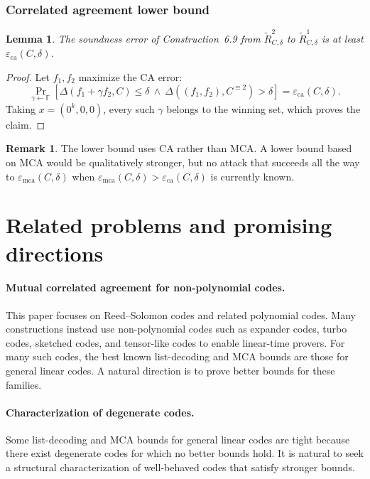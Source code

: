 \documentclass[11pt]{article}
\theoremstyle{plain}
\newtheorem{lemma}[theorem]{Lemma}
\theoremstyle{definition}
\newtheorem{remark}[theorem]{Remark}
\newcommand{\F}{\mathbb{F}}
\newcommand{\epsca}{\varepsilon_{\mathrm{ca}}}
\newcommand{\epsmca}{\varepsilon_{\mathrm{mca}}}
\DeclareMathOperator*{\Prb}{Pr}
\begin{document}
\subsubsection{Correlated agreement lower bound}

\begin{lemma}
The soundness error of Construction~6.9 from $\widetilde R_{C,\delta}^2$ to $\widetilde R_{C,\delta}^1$ is at least $\epsca(C,\delta)$.
\end{lemma}

\begin{proof}
Let $f_1,f_2$ maximize the CA error:
\[
\Prb_{\gamma\leftarrow\F}\left[
\Delta(f_1+\gamma f_2,C)\le\delta
\ \wedge\
\Delta((f_1,f_2),C^{\equiv2})>\delta
\right]=\epsca(C,\delta).
\]
Taking $x=(0^k,0,0)$, every such $\gamma$ belongs to the winning set, which proves the claim.
\end{proof}

\begin{remark}
The lower bound uses CA rather than MCA. A lower bound based on MCA would be qualitatively stronger, but no attack that succeeds all the way to $\epsmca(C,\delta)$ when $\epsmca(C,\delta)>\epsca(C,\delta)$ is currently known.
\end{remark}

\section{Related problems and promising directions}

\paragraph{Mutual correlated agreement for non-polynomial codes.}
This paper focuses on Reed--Solomon codes and related polynomial codes. Many constructions instead use non-polynomial codes such as expander codes, turbo codes, sketched codes, and tensor-like codes to enable linear-time provers. For many such codes, the best known list-decoding and MCA bounds are those for general linear codes. A natural direction is to prove better bounds for these families.

\paragraph{Characterization of degenerate codes.}
Some list-decoding and MCA bounds for general linear codes are tight because there exist degenerate codes for which no better bounds hold. It is natural to seek a structural characterization of well-behaved codes that satisfy stronger bounds.
\end{document}
